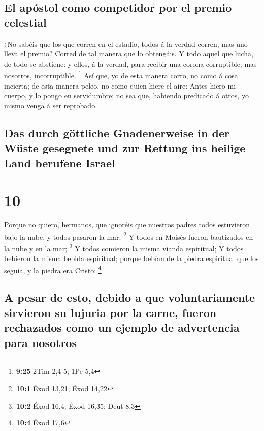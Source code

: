 \hypertarget{el-apuxf3stol-como-competidor-por-el-premio-celestial}{%
\subsection{El apóstol como competidor por el premio
celestial}\label{el-apuxf3stol-como-competidor-por-el-premio-celestial}}

 ¿No sabéis que los que corren en el estadio, todos á la
verdad corren, mas uno lleva el premio? Corred de tal manera que lo
obtengáis.  Y todo aquel que lucha, de todo se abstiene:
y ellos, á la verdad, para recibir una corona corruptible; mas nosotros,
incorruptible. \footnote{\textbf{9:25} 2Tim 2,4-5; 1Pe 5,4}
 Así que, yo de esta manera corro, no como á cosa
incierta; de esta manera peleo, no como quien hiere el aire:
 Antes hiero mi cuerpo, y lo pongo en servidumbre; no sea
que, habiendo predicado á otros, yo mismo venga á ser reprobado.

\hypertarget{das-durch-guxf6ttliche-gnadenerweise-in-der-wuxfcste-gesegnete-und-zur-rettung-ins-heilige-land-berufene-israel}{%
\subsection{Das durch göttliche Gnadenerweise in der Wüste gesegnete und
zur Rettung ins heilige Land berufene
Israel}\label{das-durch-guxf6ttliche-gnadenerweise-in-der-wuxfcste-gesegnete-und-zur-rettung-ins-heilige-land-berufene-israel}}

\hypertarget{section-9}{%
\section{10}\label{section-9}}

 Porque no quiero, hermanos, que ignoréis que nuestros
padres todos estuvieron bajo la nube, y todos pasaron la mar;
\footnote{\textbf{10:1} Éxod 13,21; Éxod 14,22}  Y todos
en Moisés fueron bautizados en la nube y en la mar; \footnote{\textbf{10:2}
  Éxod 16,4; Éxod 16,35; Deut 8,3}  Y todos comieron la
misma vianda espiritual;  Y todos bebieron la misma bebida
espiritual; porque bebían de la piedra espiritual que los seguía, y la
piedra era Cristo: \footnote{\textbf{10:4} Éxod 17,6}

\hypertarget{a-pesar-de-esto-debido-a-que-voluntariamente-sirvieron-su-lujuria-por-la-carne-fueron-rechazados-como-un-ejemplo-de-advertencia-para-nosotros}{%
\subsection{A pesar de esto, debido a que voluntariamente sirvieron su
lujuria por la carne, fueron rechazados como un ejemplo de advertencia
para
nosotros}\label{a-pesar-de-esto-debido-a-que-voluntariamente-sirvieron-su-lujuria-por-la-carne-fueron-rechazados-como-un-ejemplo-de-advertencia-para-nosotros}}

